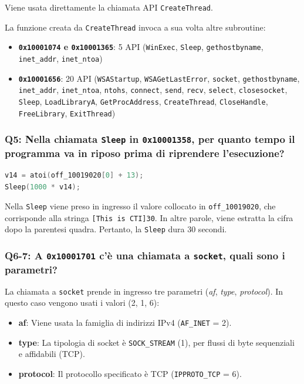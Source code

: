 Viene usata direttamente la chiamata API \texttt{CreateThread}.

La funzione creata da \texttt{CreateThread} invoca a sua volta altre subroutine:
\begin{itemize}
  \item \textbf{\texttt{0x10001074} e \texttt{0x10001365}}: 5 API (\texttt{WinExec}, \texttt{Sleep}, \texttt{gethostbyname}, \texttt{inet\_addr}, \texttt{inet\_ntoa})
  \item \textbf{\texttt{0x10001656}}: 20 API (\texttt{WSAStartup}, \texttt{WSAGetLastError}, \texttt{socket}, \texttt{gethostbyname}, \texttt{inet\_addr}, \texttt{inet\_ntoa}, \texttt{ntohs}, \texttt{connect}, \texttt{send}, \texttt{recv}, \texttt{select}, \texttt{closesocket}, \texttt{Sleep}, \texttt{LoadLibraryA}, \texttt{GetProcAddress}, \texttt{CreateThread}, \texttt{CloseHandle}, \texttt{FreeLibrary}, \texttt{ExitThread})
\end{itemize}

\subsubsection{Q5: Nella chiamata \texttt{Sleep} in \texttt{0x10001358}, per quanto tempo il programma va in riposo prima di riprendere l'esecuzione?}

\begin{lstlisting}[language=C]
v14 = atoi(off_10019020[0] + 13);
Sleep(1000 * v14); 
\end{lstlisting}

Nella \texttt{Sleep} viene preso in ingresso il valore collocato in \texttt{off\_10019020}, che corrisponde alla stringa \texttt{[This is CTI]30}. In altre parole, viene estratta la cifra dopo la parentesi quadra. Pertanto, la \texttt{Sleep} dura 30 secondi.

\subsubsection{Q6-7: A \texttt{0x10001701} c'è una chiamata a \texttt{socket}, quali sono i parametri?}

La chiamata a \texttt{socket} prende in ingresso tre parametri (\textit{af}, \textit{type}, \textit{protocol}). In questo caso vengono usati i valori (2, 1, 6):

\begin{itemize}
  \item \textbf{af}: Viene usata la famiglia di indirizzi IPv4 (\texttt{AF\_INET} = 2).
  \item \textbf{type}: La tipologia di socket è \texttt{SOCK\_STREAM} (1), per flussi di byte sequenziali e affidabili (TCP).
  \item \textbf{protocol}: Il protocollo specificato è TCP (\texttt{IPPROTO\_TCP} = 6).
\end{itemize}

